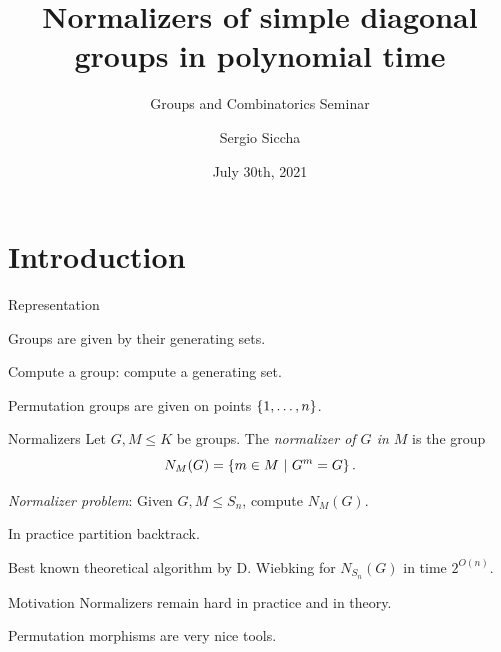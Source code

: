 \documentclass{beamer}
\title{Normalizers of simple diagonal groups in polynomial time}
\subtitle{Groups and Combinatorics Seminar}
\date{July 30th, 2021}
\author{Sergio Siccha}
\institute{TU Kaiserslautern}
\theoremstyle{plain}
\theoremstyle{definition}
\begin{document}
\maketitle
{}

\section{Introduction}

\begin{frame}{Representation}

Groups are given by their generating sets.

Compute a group: compute a generating set.

Permutation groups are given on points $ \left\{ 1, \ldots, n \right\} $.

\end{frame}

\begin{frame}{Normalizers}
Let $G, M \leq K$ be groups.
The \emph{normalizer of $G$ in $M$} is
the group
\[
N_M(G) =  \left\{  m \in M ~|~ G ^ m = G  \right\} .
\]

\pause
\emph{Normalizer problem}: Given $G, M \leq S_n$, compute $N_M(G)$.

\pause
In practice partition backtrack.

Best known theoretical algorithm by D. Wiebking for
$N_{S_n}(G)$ in
time $2 ^ {O(n)}$.
\end{frame}



\begin{frame}{Motivation}
Normalizers remain hard in practice and in theory.

Permutation morphisms are very nice tools.
\end{frame}
\end{document}
